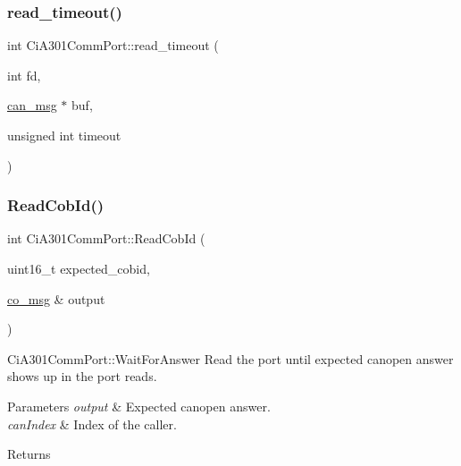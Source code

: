 \mbox{\label{classCiA301CommPort_ae62c2389b38a0e217aff7ca17a3d87b6}} 
\subsubsection{\texorpdfstring{read\+\_\+timeout()}{read\_timeout()}}
{\footnotesize\ttfamily int Ci\+A301\+Comm\+Port\+::read\+\_\+timeout (\begin{DoxyParamCaption}\item[{int}]{fd,  }\item[{\hyperlink{structcan__msg}{can\+\_\+msg} $\ast$}]{buf,  }\item[{unsigned int}]{timeout }\end{DoxyParamCaption})\hspace{0.3cm}{\ttfamily [private]}}

\mbox{\label{classCiA301CommPort_a408f53d13935a1916ca6f21d08ae135e}} 
\subsubsection{\texorpdfstring{Read\+Cob\+Id()}{ReadCobId()}}
{\footnotesize\ttfamily int Ci\+A301\+Comm\+Port\+::\+Read\+Cob\+Id (\begin{DoxyParamCaption}\item[{uint16\+\_\+t}]{expected\+\_\+cobid,  }\item[{\hyperlink{structco__msg}{co\+\_\+msg} \&}]{output }\end{DoxyParamCaption})\hspace{0.3cm}{\ttfamily [private]}}



Ci\+A301\+Comm\+Port\+::\+Wait\+For\+Answer Read the port until expected canopen answer shows up in the port reads. 


\begin{DoxyParams}{Parameters}
{\em output} & Expected canopen answer. \\
\hline
{\em can\+Index} & Index of the caller. \\
\hline
\end{DoxyParams}
\begin{DoxyReturn}{Returns}

\end{DoxyReturn}
\mbox{\label{classCiA301CommPort_a46534ff9e7e2a05a0b4913e4331710e5}} 
